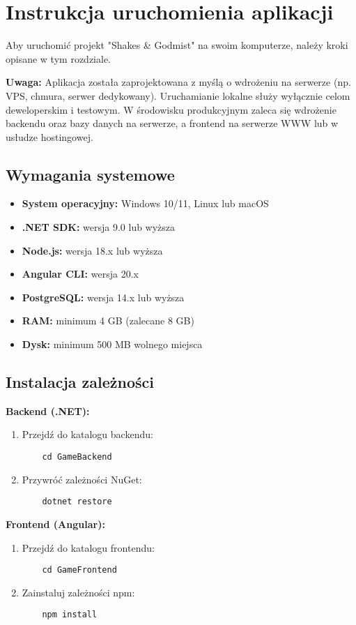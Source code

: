 ﻿%
\chapter{Instrukcja uruchomienia aplikacji}

Aby uruchomić projekt "Shakes \& Godmist" na swoim komputerze, należy kroki opisane w tym rozdziale.

\textbf{Uwaga:} Aplikacja została zaprojektowana z myślą o wdrożeniu na serwerze (np. VPS, chmura, serwer dedykowany). Uruchamianie lokalne służy wyłącznie celom deweloperskim i testowym. W środowisku produkcyjnym zaleca się wdrożenie backendu oraz bazy danych na serwerze, a frontend na serwerze WWW lub w usłudze hostingowej.

\section{Wymagania systemowe}
\begin{itemize}
    \item \textbf{System operacyjny:} Windows 10/11, Linux lub macOS
    \item \textbf{.NET SDK:} wersja 9.0 lub wyższa
    \item \textbf{Node.js:} wersja 18.x lub wyższa
    \item \textbf{Angular CLI:} wersja 20.x
    \item \textbf{PostgreSQL:} wersja 14.x lub wyższa
    \item \textbf{RAM:} minimum 4 GB (zalecane 8 GB)
    \item \textbf{Dysk:} minimum 500 MB wolnego miejsca
\end{itemize}

\section{Instalacja zależności}
\textbf{Backend (.NET):}
\begin{enumerate}
    \item Przejdź do katalogu backendu:
    \begin{verbatim}
    cd GameBackend
    \end{verbatim}
    \item Przywróć zależności NuGet:
    \begin{verbatim}
    dotnet restore
    \end{verbatim}
\end{enumerate}

\textbf{Frontend (Angular):}
\begin{enumerate}
    \item Przejdź do katalogu frontendu:
    \begin{verbatim}
    cd GameFrontend
    \end{verbatim}
    \item Zainstaluj zależności npm:
    \begin{verbatim}
    npm install
    \end{verbatim}
\end{enumerate}

